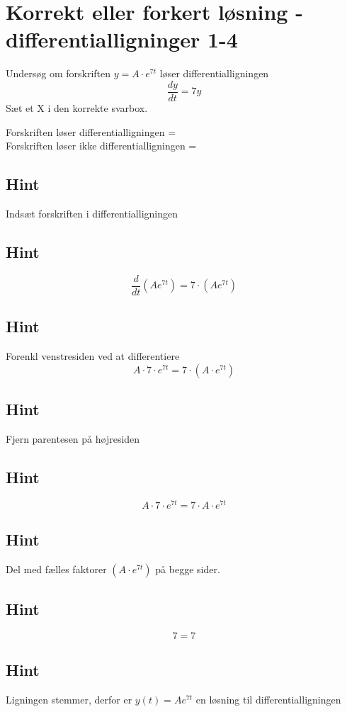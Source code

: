 \documentclass{article}
\newenvironment{exercise}[1]{\newpage\section{#1}}{}
\newcommand{\answerbox}[1]{\fbox{$#1$}}
\newcommand{\hint}{\subsection*{Hint}}
\begin{document}
\begin{exercise}{Korrekt eller forkert løsning - differentialligninger 1-4}
	
	
	Undersøg om forskriften $y = A \cdot e^{7t}$ løser differentialligningen
	\[
	\frac{dy}{dt} = 7y
	\]
	Sæt et X i den korrekte svarbox.
	
	Forskriften løser differentialligningen = \answerbox{X} \\
	
	Forskriften løser ikke differentialligningen = \answerbox{}
	
	\hint
	
	Indsæt forskriften i differentialligningen
	
	\hint
	\[
	\frac{d}{dt} \left( A e^{7t}\right) = 7 \cdot \left( A e^{7t} \right)
	\]
	
	
	\hint
	
	Forenkl venstresiden ved at differentiere
	\[
	A \cdot 7 \cdot e^{7t} = 7 \cdot \left(A \cdot e^{7t} \right)
	\]
	
	\hint
	
	Fjern parentesen på højresiden
	
	\hint
	\[
	A \cdot 7 \cdot e^{7t} = 7 \cdot A \cdot e^{7t}
	\]
	
	\hint
	Del med fælles faktorer $\left( A \cdot e^{7t} \right)$ på begge sider.
	
	\hint
	
	\[
	7 = 7
	\]
	
	
	\hint
	
	Ligningen stemmer, derfor er $y(t) = A e^{7t}$ en løsning til differentialligningen
	
\end{exercise}

\newpage
\end{document}
